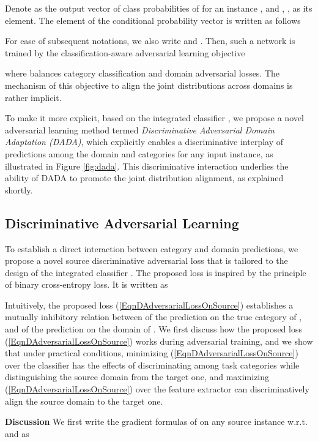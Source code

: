 \documentclass[letterpaper]{article} \usepackage{aaai20}  \usepackage{times}  \usepackage{helvet} \usepackage{courier}  \usepackage[hyphens]{url}  \usepackage{graphicx} \urlstyle{rm} \def\UrlFont{\rm}  \usepackage{graphicx}  \frenchspacing  \setlength{\pdfpagewidth}{8.5in}  \setlength{\pdfpageheight}{11in}
\begin{document}
Denote  as the output vector of class probabilities of  for an instance , and , , as its  element. The  element of the conditional probability vector  is written as follows 

For ease of subsequent notations, we also write  and . Then, such a network is trained by the classification-aware adversarial learning objective 

where  balances category classification and domain adversarial losses. The mechanism of this objective to align the joint distributions across domains is rather implicit. 

To make it more explicit, based on the integrated classifier , we propose a novel adversarial learning method termed \emph{Discriminative Adversarial Domain Adaptation (DADA)}, which explicitly enables a discriminative interplay of predictions among the domain and  categories for any input instance, as illustrated in Figure \ref{fig:dada}. This discriminative interaction underlies the ability of DADA to promote the joint distribution alignment, as explained shortly.

\subsection{Discriminative Adversarial Learning}
To establish a direct interaction between category and domain predictions, we propose a novel source discriminative adversarial loss that is tailored to the design of the integrated classifier . The proposed loss is inspired by the principle of binary cross-entropy loss. It is written as

Intuitively, the proposed loss (\ref{EqnDAdversarialLossOnSource}) establishes a mutually inhibitory relation between  of the prediction on the true category of , and  of the prediction on the domain of . We first discuss how the proposed loss (\ref{EqnDAdversarialLossOnSource}) works during adversarial training, and we show that under practical conditions, minimizing (\ref{EqnDAdversarialLossOnSource}) over the classifier  has the effects of discriminating among task categories while distinguishing the source domain from the target one, and maximizing (\ref{EqnDAdversarialLossOnSource}) over the feature extractor  can discriminatively align the source domain to the target one.

\noindent\textbf{Discussion} We first write the gradient formulas of  on any source instance  w.r.t.  and  as
\end{document}
